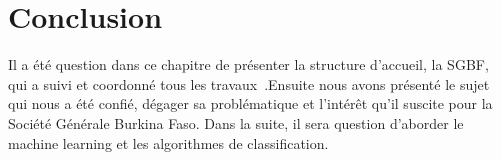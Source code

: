 

\section*{Conclusion}
Il  a été question dans ce chapitre de présenter  la structure d’accueil,
la SGBF, qui a suivi et coordonné tous les travaux .Ensuite nous avons
présenté le sujet qui nous a été confié, dégager sa problématique et
l’intérêt qu’il suscite pour la Société Générale Burkina Faso. Dans la suite,
il sera question  d’aborder le machine learning et les algorithmes de classification.

